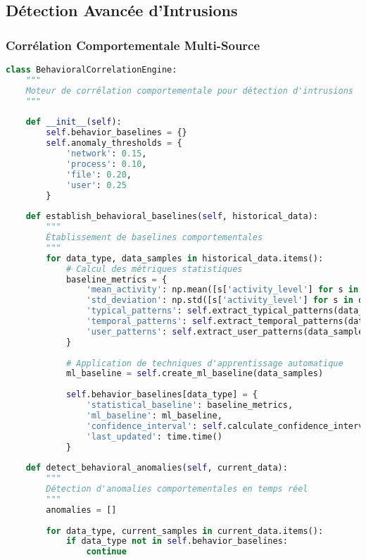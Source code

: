 \subsection{Détection Avancée d'Intrusions}

\subsubsection{Corrélation Comportementale Multi-Source}

\begin{lstlisting}[language=Python, caption=Moteur de corrélation comportementale]
class BehavioralCorrelationEngine:
    """
    Moteur de corrélation comportementale pour détection d'intrusions
    """
    
    def __init__(self):
        self.behavior_baselines = {}
        self.anomaly_thresholds = {
            'network': 0.15,
            'process': 0.10,
            'file': 0.20,
            'user': 0.25
        }
        
    def establish_behavioral_baselines(self, historical_data):
        """
        Établissement de baselines comportementales
        """
        for data_type, data_samples in historical_data.items():
            # Calcul des métriques statistiques
            baseline_metrics = {
                'mean_activity': np.mean([s['activity_level'] for s in data_samples]),
                'std_deviation': np.std([s['activity_level'] for s in data_samples]),
                'typical_patterns': self.extract_typical_patterns(data_samples),
                'temporal_patterns': self.extract_temporal_patterns(data_samples),
                'user_patterns': self.extract_user_patterns(data_samples)
            }
            
            # Application de techniques d'apprentissage automatique
            ml_baseline = self.create_ml_baseline(data_samples)
            
            self.behavior_baselines[data_type] = {
                'statistical_baseline': baseline_metrics,
                'ml_baseline': ml_baseline,
                'confidence_interval': self.calculate_confidence_interval(data_samples),
                'last_updated': time.time()
            }
            
    def detect_behavioral_anomalies(self, current_data):
        """
        Détection d'anomalies comportementales en temps réel
        """
        anomalies = []
        
        for data_type, current_samples in current_data.items():
            if data_type not in self.behavior_baselines:
                continue
                

\end{lstlisting}
